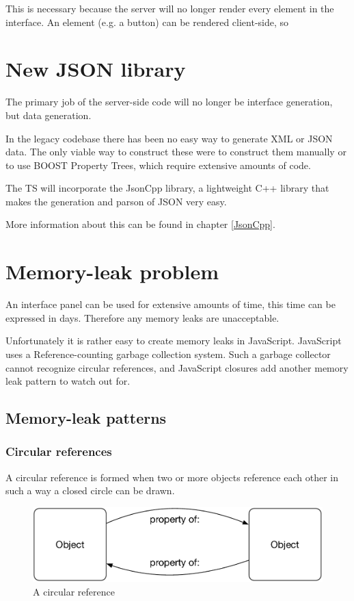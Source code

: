 This is necessary because the server will no longer render every element in the
interface. An element (e.g. a button) can be rendered client-side, so

\section{New JSON library}
The primary job of the server-side code will no longer be interface generation,
but data generation.

In the legacy codebase there has been no easy way to generate XML or
JSON data. The only viable way to construct these were to construct them manually
or to use BOOST Property Trees, which require extensive amounts of code.

The TS will incorporate the JsonCpp library, a lightweight C++ library that
makes the generation and parson of JSON very easy.

More information about this can be found in chapter \ref{JsonCpp}.

\section{Memory-leak problem}
\label{Memory-leak problem}
An interface panel can be used for extensive amounts of time, this time can be
expressed in days. Therefore any memory leaks are unacceptable.

Unfortunately it is rather easy to create memory leaks in JavaScript.
JavaScript uses a Reference-counting garbage collection system\cite{IBM_MemoryLeaks}.
Such a garbage collector cannot recognize circular references, and JavaScript
closures add another memory leak pattern to watch out for.

\subsection{Memory-leak patterns}
\subsubsection{Circular references}
A circular reference is formed when two or more objects reference each other in
such a way a closed circle can be drawn.
\begin{figure}[H]
  \centering
  \includegraphics[width=.5\textwidth]{images/circular_reference}
  \caption{A circular reference}
  \label{fig:circular_reference}
\end{figure}

